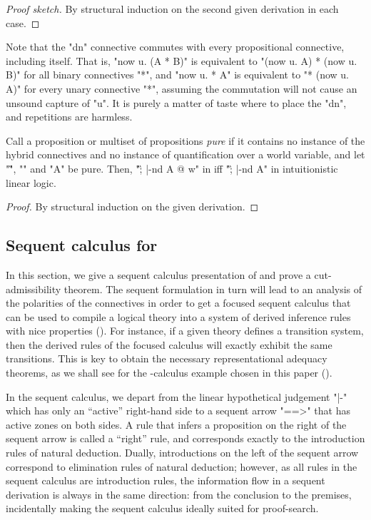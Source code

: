 \documentclass{article}
\begin{document}
\begin{proof}[Proof sketch]
  By structural induction on the second given derivation in each case.
\end{proof}

Note that the "dn" connective commutes with every propositional connective, including itself. That
is, "now u. (A * B)" is equivalent to "(now u. A) * (now u. B)" for all binary connectives "*", and
"now u. * A" is equivalent to "* (now u. A)" for every unary connective "*", assuming the
commutation will not cause an unsound capture of "u". It is purely a matter of taste where to place
the "dn", and repetitions are harmless.

\begin{thm}[conservativity]
  \label{thm:conserv}
  Call a proposition or multiset of propositions \emph{pure} if it contains no
  instance of the hybrid connectives and no instance of quantification over a world variable, 
  and let "\G", "\D" and "A" be pure. 
  Then, "\G ; \D |-nd A @ w" in \hyll iff "\G ; \D |-nd A" in intuitionistic linear logic.
\end{thm}

\begin{proof}
  By structural induction on the given \hyll derivation.
\end{proof}

\subsection{Sequent calculus for \hyll}

In this section, we give a sequent calculus presentation of \hyll and prove a
cut-admissibility theorem.  The sequent formulation in turn will lead to an
analysis of the polarities of the connectives in order to get a focused sequent
calculus that can be used to compile a logical theory into a system of derived
inference rules with nice properties ().  For instance, if a
given theory defines a transition system, then the derived rules of the focused
calculus will exactly exhibit the same transitions. This is key to obtain the
necessary representational adequacy theorems,
as we shall see for the \spi-calculus example chosen in this paper (). 

In the sequent calculus, we depart from the linear hypothetical judgement "|-"
which has only an ``active'' right-hand side to a sequent arrow "==>" that has
active zones on both sides. A rule that infers a proposition on the right of the
sequent arrow is called a ``right'' rule, and corresponds exactly to the
introduction rules of natural deduction. Dually, introductions on the left of
the sequent arrow correspond to elimination rules of natural deduction; however,
as all rules in the sequent calculus are introduction rules, the information
flow in a sequent derivation is always in the same direction: from the
conclusion to the premises, incidentally making the sequent calculus ideally
suited for proof-search.
\end{document}

